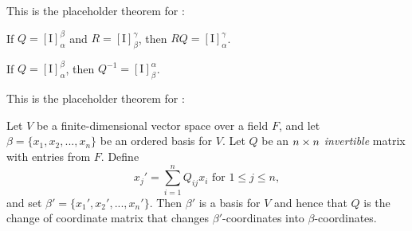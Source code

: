 \begin{additional theorem} \label{athm 2.49}
This is the placeholder theorem for :

 If \(Q = [\mathrm{I}]_{\alpha}^{\beta}\) and \(R = [\mathrm{I}]_{\beta}^{\gamma}\), then \(RQ = [\mathrm{I}]_{\alpha}^{\gamma}\).

 If \(Q = [\mathrm{I}]_{\alpha}^{\beta}\), then \(Q^{-1} = [\mathrm{I}]_{\beta}^{\alpha}\).
\end{additional theorem}

\begin{additional theorem} \label{athm 2.50}
This is the placeholder theorem for :

\sloppy Let \(V\) be a finite-dimensional vector space over a field \(F\), and let \(\beta = \{ x_1, x_2, ..., x_n \}\) be an ordered basis for \(V\).
Let \(Q\) be an \(n \times n\) \emph{invertible} matrix with entries from \(F\).
Define
\[
    x_j' = \sum_{i = 1}^n Q_{ij} x_i \text{ for } 1 \le j \le n,
\]
and set \(\beta' = \{ x_1', x_2', ..., x_n' \}\).
Then \(\beta'\) is a basis for \(V\) and hence that \(Q\) is the change of coordinate matrix that changes \(\beta'\)-coordinates into \(\beta\)-coordinates.
\end{additional theorem}
